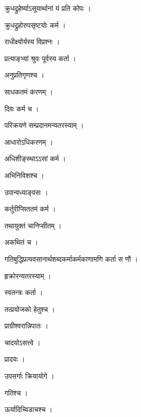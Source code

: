 \documentclass[10pt, openany]{book}
\begin{document}
\noindent क्रुधद्रुहेर्ष्याऽसूयार्थानां यं प्रति कोपः ।

\noindent क्रुधद्रुहोरुपसृष्टयोः कर्म ।

\noindent राधीक्ष्योर्यस्य विप्रश्नः ।

\noindent प्रत्याङ्भ्यां श्रुवः पूर्वस्य कर्ता ।

\noindent अनुप्रतिगृणश्च ।

\noindent साधकतमं करणम् ।

\noindent दिवः कर्म च ।

\noindent परिक्रयणे सम्प्रदानमन्यतरस्याम् ।

\noindent आधारोऽधिकरणम् ।

\noindent अधिशीङ्स्थाऽऽसां कर्म ।

\noindent अभिनिविशश्च ।

\noindent उपान्वध्याङ्वसः ।

\noindent कर्तुरीप्सिततमं कर्म ।

\noindent तथायुक्तं चानिप्सीतम् ।

\noindent अकथितं च ।

\noindent गतिबुद्धिप्रत्यवसानार्थशब्दकर्माकर्मकाणामणि कर्ता स णौ ।

\noindent हृक्रोरन्यतरस्याम् ।

\noindent स्वतन्त्रः कर्ता ।

\noindent तत्प्रयोजको हेतुश्च ।

\noindent प्राग्रीश्वरान्निपातः ।

\noindent चादयोऽसत्त्वे ।

\noindent प्रादयः ।

\noindent उपसर्गाः क्रियायोगे ।

\noindent गतिश्च ।

\noindent ऊर्यादिच्विडाचश्च ।
\end{document}
